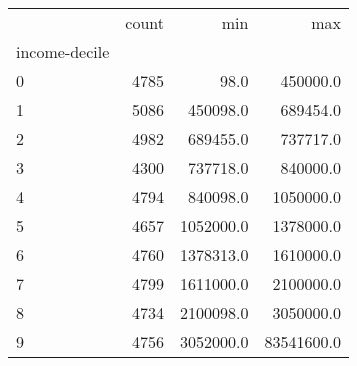 \begin{tabular}{lrrr}
\toprule
{} &  count &        min &         max \\
income-decile &        &            &             \\
\midrule
0             &   4785 &       98.0 &    450000.0 \\
1             &   5086 &   450098.0 &    689454.0 \\
2             &   4982 &   689455.0 &    737717.0 \\
3             &   4300 &   737718.0 &    840000.0 \\
4             &   4794 &   840098.0 &   1050000.0 \\
5             &   4657 &  1052000.0 &   1378000.0 \\
6             &   4760 &  1378313.0 &   1610000.0 \\
7             &   4799 &  1611000.0 &   2100000.0 \\
8             &   4734 &  2100098.0 &   3050000.0 \\
9             &   4756 &  3052000.0 &  83541600.0 \\
\bottomrule
\end{tabular}
